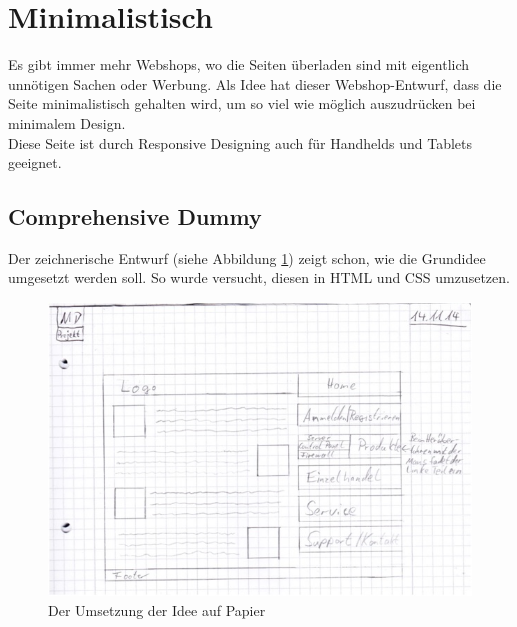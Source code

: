 \section{Minimalistisch}
Es gibt immer mehr Webshops, wo die Seiten überladen sind mit eigentlich unnötigen Sachen oder Werbung. Als Idee hat dieser Webshop-Entwurf, dass die Seite minimalistisch gehalten wird, um so viel wie möglich auszudrücken bei minimalem Design.  
\\
Diese Seite ist durch Responsive Designing auch für Handhelds und Tablets geeignet.
	\subsection{Comprehensive Dummy}
Der zeichnerische Entwurf (siehe Abbildung \ref{mini_comp1}) zeigt schon, wie die Grundidee umgesetzt werden soll. So wurde versucht, diesen in HTML und CSS umzusetzen.
\begin{figure} [hp]
\includegraphics[width=\textwidth]{./img/mini_comp1.png}
\caption{Der Umsetzung der Idee auf Papier}
\label{mini_comp1}
\end{figure}
